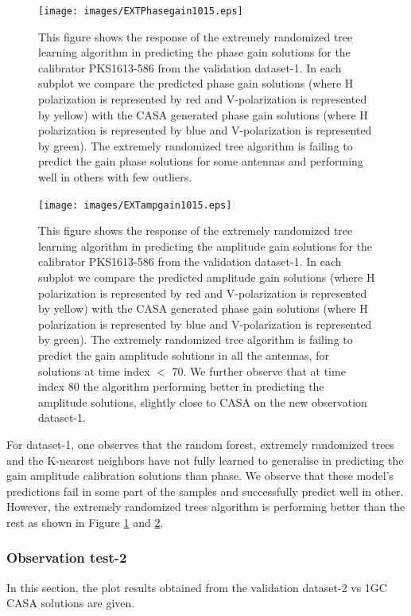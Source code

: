\begin{figure}[H]
    \texttt{[image: images/EXTPhasegain1015.eps]}
    \caption{This figure shows the response of the extremely randomized tree learning algorithm in predicting the phase gain solutions for the calibrator PKS1613-586 from the validation dataset-1. In each subplot we compare the predicted phase gain solutions (where H polarization is represented by red and V-polarization is represented by yellow) with the CASA generated phase gain solutions (where H polarization is represented by blue and V-polarization is represented by green). The extremely randomized tree algorithm is failing to predict the gain phase solutions for some antennas and performing well in others with few outliers.}
    \label{obs8}
\end{figure}

\begin{figure}[H]
    \texttt{[image: images/EXTampgain1015.eps]}
    \caption{This figure shows the response of the extremely randomized tree learning algorithm in predicting the amplitude gain solutions for the calibrator PKS1613-586 from the validation dataset-1. In each subplot we compare the predicted amplitude gain solutions (where H polarization is represented by red and V-polarization is represented by yellow) with the CASA generated phase gain solutions (where H polarization is represented by blue and V-polarization is represented by green). The extremely randomized tree algorithm is failing to predict the gain amplitude solutions in all the antennas, for solutions at time index $<$ 70. We further observe that at time index $80$ the algorithm performing better in predicting the amplitude solutions, slightly close to CASA on the new observation dataset-1.}
     \label{ea2}
\end{figure}

For dataset-1, one observes that the random forest, extremely randomized trees and the K-nearest neighbors have not fully learned to generalise in predicting the gain amplitude calibration solutions than phase. We observe that these model's predictions fail in some part of the samples and successfully predict  well in other. However, the extremely randomized trees algorithm is performing better than the rest as shown in Figure \ref{obs8} and \ref{ea2}.

\subsubsection{Observation test-2}
In this section, the plot results obtained from the validation dataset-2 vs 1GC CASA solutions are given. 


